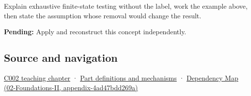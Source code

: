 Explain exhaustive finite-state testing without the label, work the example above, then state the assumption whose removal would change the result.

\textbf{Pending:} Apply and reconstruct this concept independently.

\subsection{Source and navigation}\label{source-and-navigation}

\href{Continuous\%20Notes/Computing\%20Foundations\%20-\%20From\%20Bits\%20to\%20C++\%20and\%20Systems\%20APIs\#Arithmetic\%20becomes\%20a\%20policy}{C002 teaching chapter} · \hyperref[appendix-fd090d982a15]{Part definitions and mechanisms} · \href{}{Dependency Map (02-Foundations-II, appendix-4ad47bdd269a)}

